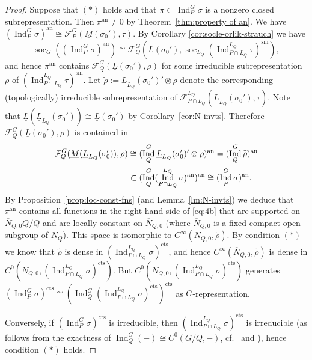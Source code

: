 \documentclass[a4paper]{amsart}
\numberwithin{equation}{section}
\theoremstyle{remark}
\theoremstyle{definition}
\DeclareMathOperator{\Ind}{Ind}
\DeclareMathOperator{\soc}{soc}
\newcommand{\sm}{\mathrm{sm}}
\newcommand{\an}{\mathrm{an}}
\newcommand{\cts}{\mathrm{cts}}
\begin{document}
\begin{proof}
  Suppose that $(*)$ holds and that $\pi \subset \Ind_{P}^G\sigma$ is a nonzero closed subrepresentation.
  Then $\pi^{\an} \ne 0$ by Theorem~\ref{thm:property of an}.
  We have $(\Ind_{P}^G\sigma)^{\an} \cong \mathcal{F}_P^G(\underline{M}(\sigma_0'),\tau)$.
  By Corollary \ref{cor:socle-orlik-strauch} we have
  \begin{equation*}
    \soc_G ((\Ind_{P}^G\sigma)^{\an}) \cong \mathcal{F}_Q^G(\underline{L}(\sigma_0'),\soc_{L_Q}(\Ind_{P \cap L_Q}^{L_Q} \tau)^{\sm}),
  \end{equation*}
  and hence $\pi^{\an}$ contains $\mathcal{F}_Q^G(\underline{L}(\sigma_0'),\rho)$ for some irreducible subrepresentation $\rho$ of $(\Ind_{P \cap L_Q}^{L_Q} \tau)^{\sm}$.
  Let $\widetilde{\rho} := \underline{L}_{L_Q}(\sigma_0')' \otimes \rho$ denote the corresponding (topologically) irreducible subrepresentation of $\mathcal{F}_{P \cap L_Q}^{L_Q} (\underline{L}_{L_Q}(\sigma_0'),\tau)$.
  Note that   $\underline{L}(\underline{L}_{L_Q}(\sigma_0')) \cong \underline{L}(\sigma_0')$ by Corollary~\ref{cor:N-invts}.
  Therefore $\mathcal{F}_Q^G(\underline{L}(\sigma_0'),\rho)$ is contained in
  \begin{align}
    \mathcal{F}_Q^G(\underline M(\underline{L}_{L_Q}(\sigma_0')),\rho) &\cong (\Ind_Q^G \underline{L}_{L_Q}(\sigma_0')' \otimes \rho)^{\an}\label{eq:4b} 
    = (\Ind_Q^G \widetilde{\rho})^{\an} \\
    &\subset (\Ind_Q^G (\Ind_{P\cap L_Q}^{L_Q} \sigma)^{\an})^{\an} \cong (\Ind_P^G \sigma)^{\an}\notag.
  \end{align}
  By Proposition~\ref{prop:loc-const-fns} (and Lemma~\ref{lm:N-invts}) we deduce that $\pi^{\an}$ contains all functions in the right-hand side of
  \eqref{eq:4b} that are supported on $\overline{N}_{Q,0}Q/Q$ and are locally constant on $\overline{N}_{Q,0}$ (where $\overline{N}_{Q,0}$ is a 
  fixed compact open subgroup of $\overline{N}_Q$).  This space is isomorphic to
  $C^\infty(\overline{N}_{Q,0}, \widetilde{\rho})$. By condition $(*)$ we know that $\widetilde{\rho}$ is dense in $(\Ind_{P \cap L_Q}^{L_Q} \sigma)^{\cts}$, and hence
  $C^\infty(\overline{N}_{Q,0}, \widetilde{\rho})$ is dense in $C^{0}(\overline{N}_{Q,0}, (\Ind_{P \cap L_Q}^{L_Q}\sigma)^{\cts})$.  But $C^{0}(\overline{N}_{Q,0}, (\Ind_{P \cap L_Q}^{L_Q}\sigma)^{\cts})$
  generates $(\Ind_P^G\sigma)^{\cts} \cong (\Ind_Q^G(\Ind_{P \cap L_Q}^{L_Q} \sigma)^{\cts})^{\cts}$ as $G$-representation.

  Conversely, if $(\Ind_P^G \sigma)^{\cts}$ is irreducible, then $(\Ind_{P \cap L_Q}^{L_Q} \sigma)^{\cts}$ is irreducible (as follows from the exactness of
  $\Ind_{Q}^{G}(-) \cong C^0(G/Q,-)$, cf.\ \cite[(2.1.3)]{locallyanalytic-memoir} and \cite[Corollary~2.2]{MR4190408}), hence condition $(*)$ holds.
\end{proof}
\end{document}
